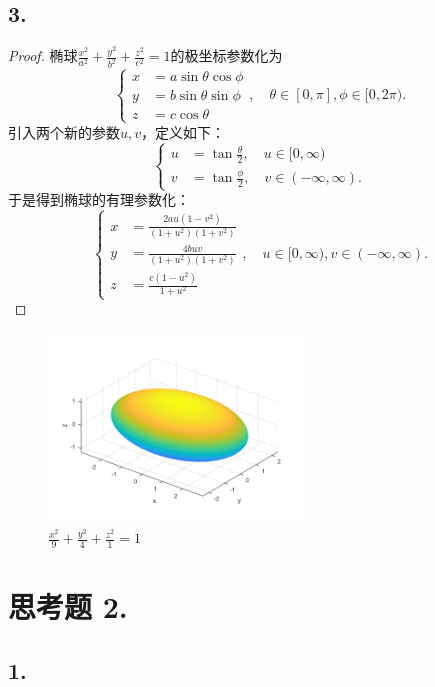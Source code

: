 \documentclass[utf8]{ctexart}
\begin{document}
\subsection*{3.}
\begin{proof}
    椭球$\frac{x^2}{a^2}+\frac{y^2}{b^2}+\frac{z^2}{c^2}=1$的极坐标参数化为
    $$
    \begin{cases}
        x &= a\sin{\theta}\cos{\phi}\\
        y &= b\sin{\theta}\sin{\phi}\\
        z &= c\cos{\theta}
    \end{cases},\quad
    \theta \in [0, \pi], \phi \in [0,2\pi).
    $$
    引入两个新的参数$u,v$，定义如下：
    $$
    \begin{cases}
        u &= \tan{\frac{\theta}{2}},\quad u \in [0,\infty)\\
        v &= \tan{\frac{\phi}{2}}, \quad v \in (-\infty, \infty).
    \end{cases}
    $$
    于是得到椭球的有理参数化：
    $$
    \begin{cases}
        x &= \frac{2au(1-v^2)}{(1+u^2)(1+v^2)}\\
        y &= \frac{4buv}{(1+u^2)(1+v^2)}\\
        z &= \frac{c(1-u^2)}{1+u^2}
    \end{cases},
    \quad u \in [0,\infty), v \in (-\infty, \infty).
    $$
\end{proof}
\begin{figure}[H]
    \centering
    \includegraphics[width=0.6\textwidth]{ellipsoid.png}
    \caption{$\frac{x^2}{9}+\frac{y^2}{4}+\frac{z^2}{1}=1$}
    \label{fig: ellipsoid}
\end{figure}

\section*{思考题 2.}
\subsection*{1.}
\end{document}
